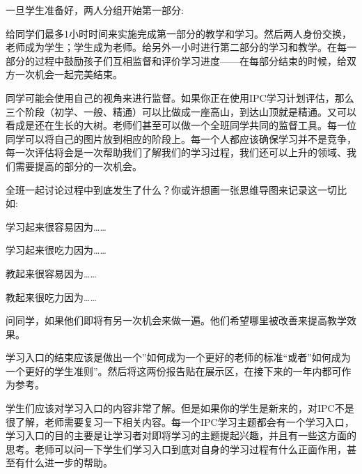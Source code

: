     一旦学生准备好，两人分组开始第一部分:\par
    给同学们最多1小时时间来实施完成第一部分的教学和学习。然后两人身份交换，老师成为学生；学生成为老师。给另外一小时进行第二部分的学习和教学。在每一部分的过程中鼓励孩子们互相监督和评价学习进度——在每部分结束的时候，给双方一次机会一起完美结束。\par
    同学可能会使用自己的视角来进行监督。如果你正在使用IPC学习计划评估，那么三个阶段（初学、一般、精通）可以比做成一座高山，到达山顶就是精通。又可以看成是还在生长的大树。老师们甚至可以做一个全班同学共同的监督工具。每一位同学可以将自己的图片放到相应的阶段上。每一个人都应该确保学习并不是竞争，每一次评估将会是一次帮助我们了解我们的学习过程，我们还可以上升的领域、我们需要提高的部分的一次机会。\par
    全班一起讨论过程中到底发生了什么？你或许想画一张思维导图来记录这一切比如:\par
    \begin{item}
      \item 学习起来很容易因为……
      \item 学习起来很吃力因为……
      \item 教起来很容易因为……
      \item 教起来很吃力因为……
    \end{item} 
    问同学，如果他们即将有另一次机会来做一遍。他们希望哪里被改善来提高教学效果。\par
    学习入口的结束应该是做出一个”如何成为一个更好的老师的标准“或者”如何成为一个更好的学生准则”。然后将这两份报告贴在展示区，在接下来的一年内都可作为参考。\par
    学生们应该对学习入口的内容非常了解。但是如果你的学生是新来的，对IPC不是很了解，老师需要复习一下相关内容。每一个IPC学习主题都会有一个学习入口，学习入口的目的主要是让学习者对即将学习的主题提起兴趣，并且有一些这方面的思考。老师可以问一下学生们学习入口到底对自身的学习过程有什么正面作用，甚至有什么进一步的帮助。\par
    
    

